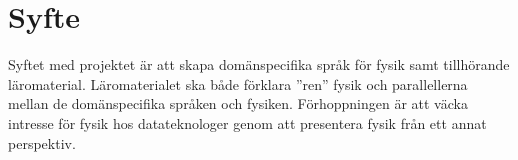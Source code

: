\documentclass[12pt,a4paper]{article}
\begin{document}
%
%
%
%
%
%

\section{Syfte}

Syftet med projektet är att skapa domänspecifika språk för fysik samt tillhörande läromaterial. Läromaterialet ska både förklara ''ren'' fysik och parallellerna mellan de domänspecifika språken och fysiken. Förhoppningen är att väcka intresse för fysik hos datateknologer genom att presentera fysik från ett annat perspektiv.

%
\end{document}
